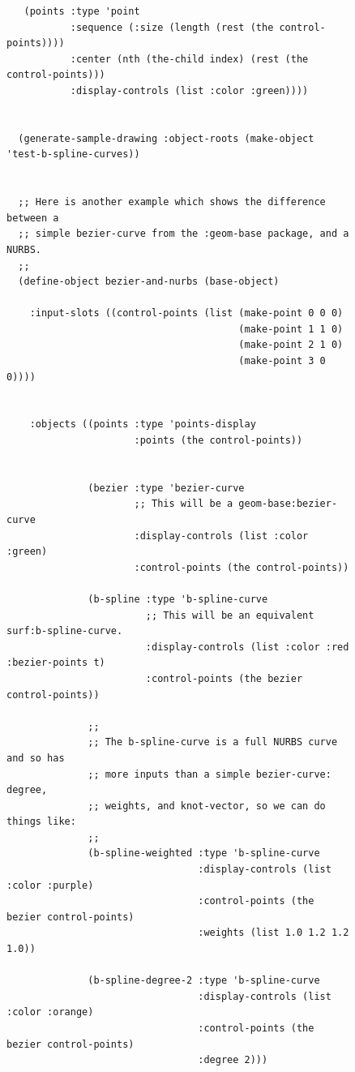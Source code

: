 \documentclass [11pt]{book}
\begin{document}
\begin{itemize}
\begin{figure}
\begin{lrbox}{\boxedverb}
\begin{minipage}{\linewidth}
{\begin{verbatim}
   (points :type 'point 
           :sequence (:size (length (rest (the control-points))))
           :center (nth (the-child index) (rest (the control-points)))
           :display-controls (list :color :green))))


  (generate-sample-drawing :object-roots (make-object 'test-b-spline-curves))


  ;; Here is another example which shows the difference between a
  ;; simple bezier-curve from the :geom-base package, and a NURBS.
  ;; 
  (define-object bezier-and-nurbs (base-object)
  
    :input-slots ((control-points (list (make-point 0 0 0)
                                        (make-point 1 1 0)
                                        (make-point 2 1 0)
                                        (make-point 3 0 0))))
  
  
    :objects ((points :type 'points-display 
                      :points (the control-points))
            
            
              (bezier :type 'bezier-curve  
                      ;; This will be a geom-base:bezier-curve
                      :display-controls (list :color :green)
                      :control-points (the control-points))
            
              (b-spline :type 'b-spline-curve 
                        ;; This will be an equivalent surf:b-spline-curve.
                        :display-controls (list :color :red :bezier-points t)
                        :control-points (the bezier control-points))

              ;;
              ;; The b-spline-curve is a full NURBS curve and so has
              ;; more inputs than a simple bezier-curve: degree,
              ;; weights, and knot-vector, so we can do things like:
              ;;
              (b-spline-weighted :type 'b-spline-curve
                                 :display-controls (list :color :purple)
                                 :control-points (the bezier control-points)
                                 :weights (list 1.0 1.2 1.2 1.0))
            
              (b-spline-degree-2 :type 'b-spline-curve
                                 :display-controls (list :color :orange)
                                 :control-points (the bezier control-points)
                                 :degree 2)))

 
\end{verbatim}}
\end{minipage}
\end{lrbox}
\fbox{\usebox{\boxedverb}}


\end{figure}
\end{itemize}
\end{document}
